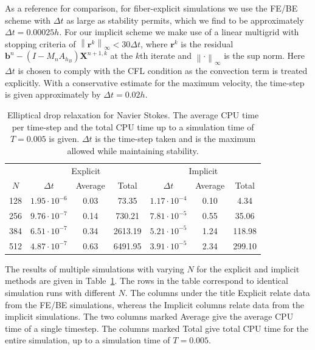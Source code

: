 \documentclass[preprint,12pt]{elsarticle}
\newcommand{\norm}[1]{\left\lVert#1\right\rVert}
\begin{document}
As a reference for comparison, for fiber-explicit simulations we use the FE/BE scheme 
 with $\Delta t$ as large as  stability permits, which we find to be approximately $\Delta t = 0.00025h$. For our implicit scheme we make use of a linear multigrid with stopping criteria of $\norm{\mathbf{r}^k}_{\infty}<30\Delta t$, where $\mathbf{r}^k$ is the residual $\mathbf{b}^n-(I-M_n A_{h_B})\mathbf{X}^{n+1,k}$ at the $k$th iterate and $\norm{\cdot}_{\infty}$ is the sup norm. Here $\Delta t$ is 
 chosen to comply with the CFL condition as the convection term is treated explicitly. With a conservative estimate for the maximum 
 velocity, the time-step is given approximately by $\Delta t = 0.02h$. 
 \begin{table}
\caption{Elliptical drop relaxation for Navier Stokes. The average CPU time per time-step and the total CPU time up to a simulation time of $T=0.005$ is given. $\Delta t$ is the time-step taken and is the maximum allowed while maintaining stability.}
\label{table:EllipseConvectiveSims}
\begin{center}
\begin{tabular}{|c |c c c| c c c|}
\hline
& \multicolumn{3}{c|}{Explicit} & \multicolumn{3}{c|}{Implicit}\\
$N$ & $\Delta t$ & Average & Total & $\Delta t$ & Average & Total\\
\hline
128 & $1.95\cdot 10^{-6}$ & 0.03 & 73.35 & $1.17\cdot 10^{-4}$ & 0.10 & 4.34 \\
256 & $9.76\cdot 10^{-7}$ & 0.14 & 730.21 & $7.81\cdot 10^{-5}$ & 0.55 & 35.06\\
384 & $6.51\cdot 10^{-7}$ & 0.34 & 2613.19 & $5.21\cdot 10^{-5}$ & 1.24 & 118.98\\
512 & $4.87\cdot 10^{-7}$ & 0.63 & 6491.95 & $3.91\cdot 10^{-5}$ & 2.34 & 299.10\\
\hline
\end{tabular}
\end{center}
\end{table}

The results of multiple simulations with varying $N$ for the explicit and implicit methods are given in 
Table~\ref{table:EllipseConvectiveSims}. The rows in the table correspond to identical simulation runs with different $N$. The columns under the title Explicit relate data from the FE/BE simulations, whereas the Implicit columns relate data from the implicit simulations. The two columns marked Average give the average CPU time of a single timestep. The columns marked Total give total CPU time for the entire simulation, up to a simulation time of $T=0.005$.
\end{document}
